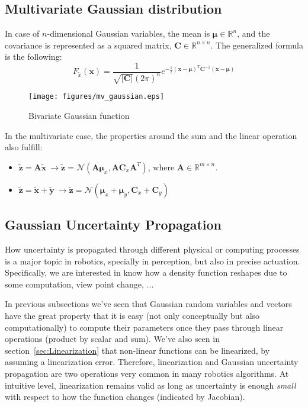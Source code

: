 \subsection{Multivariate Gaussian distribution}
\label{subsec:mulivariate_gaussian_distribution}
In case of $n$-dimensional Gaussian variables, the mean is $\boldsymbol{\mu} \in \mathbb{R}^n$, and the covariance is represented as a squared matrix, $\mathbf{C}\in\mathbb{R}^{n\times n}$. The generalized formula is the following: 
\begin{equation}
 F_{\tilde{x}}(\mathbf{x}) = \frac{1}{\sqrt{\vert \mathbf{C}\vert}(2\pi)^n}
			    e^{-\frac{1}{2}(\mathbf{x}-\boldsymbol\mu)^T\mathbf{C}^{-1}(\mathbf{x}-\boldsymbol\mu)}
\end{equation}
\begin{figure}[bth!]
  \begin{center}
    \texttt{[image: figures/mv\_gaussian.eps]}
    \caption{Bivariate Gaussian function}
    \label{fig:mv_gaussian}
  \end{center}
\end{figure}

In the multivariate case, the properties around the sum and the linear operation also fulfill: 
\begin{itemize}
 \item $\tilde{\mathbf{z}}=\mathbf{A}\tilde{\mathbf{x}} \ 
      \rightarrow \tilde{\mathbf{z}}=\mathcal{N}(\mathbf{A}\boldsymbol\mu_x,\mathbf{A}\mathbf{C}_x\mathbf{A}^T)$, 
      where $\mathbf{A}\in \mathbb{R}^{m \times n}$.
 \item $\tilde{\mathbf{z}}=\tilde{\mathbf{x}}+\tilde{\mathbf{y}} \ 
      \rightarrow \tilde{\mathbf{z}}=\mathcal{N}(\boldsymbol\mu_x+\boldsymbol\mu_y,\mathbf{C}_x+\mathbf{C}_y)$
\end{itemize}


\subsection{Gaussian Uncertainty Propagation}
\label{subsec:gaussian_uncertainty_propagation}
How uncertainty is propagated through different physical or computing processes is a major topic in robotics, specially in perception, but also in precise actuation. Specifically, we are interested in know how a density function reshapes due to some computation, view point change, ...

In previous subsections we've seen that Gaussian random variables and vectors have the great property that it is easy (not only conceptually but also computationally) to compute their parameters once they pass through linear operations (product by scalar and sum). We've also seen in section~\ref{sec:Linearization} that non-linear functions can be linearized, by assuming a linearization error. Therefore, linearization and Gaussian uncertainty propagation are two operations very common in many robotics algorithms. At intuitive level, linearization remains valid as long as uncertainty is enough \textit{small} with respect to how the function changes (indicated by Jacobian). 

